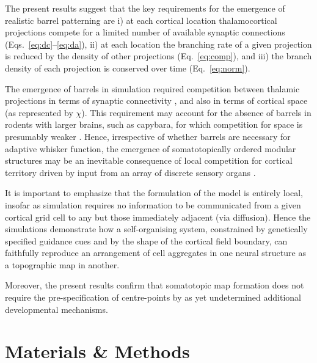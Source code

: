 \documentclass[9pt,lineno]{elife}
\begin{document}
The present results suggest that the key requirements for the emergence of
realistic barrel patterning are i) at each cortical location thalamocortical
projections compete for a limited number of available synaptic connections
(Eqs.~\ref{eq:dc}--\ref{eq:da}), ii) at each location the branching rate of a
given projection is reduced by the density of other projections
(Eq.~\ref{eq:comp}), and iii) the branch density of each projection is
conserved over time (Eq.~\ref{eq:norm}).

The emergence of barrels in simulation required competition between thalamic
projections in terms of synaptic connectivity , and also in terms of
cortical space (as represented by $\chi$). This requirement may account for
the absence of barrels in rodents with larger brains, such as capybara, for
which competition for space is presumably weaker
\citep{woolsey_comparative_1975}. Hence, irrespective of whether barrels are
necessary for adaptive whisker function, the emergence of somatotopically
ordered modular structures may be an inevitable consequence of local
competition for cortical territory driven by input from an array of discrete
sensory organs \citep{purves_iterated_1992}.


It is important to emphasize that the formulation of the model is entirely
local, insofar as simulation requires no information to be communicated from a
given cortical grid cell to any but those immediately adjacent (via
diffusion). Hence the simulations demonstrate how a self-organising system,
constrained by genetically specified guidance cues and by the shape of the
cortical field boundary, can faithfully reproduce an arrangement of cell
aggregates in one neural structure as a topographic map in another.

Moreover, the present results confirm that somatotopic map formation does not
require the pre-specification of centre-points by as yet undetermined
additional developmental mechanisms.

\section{Materials \& Methods}
\end{document}
